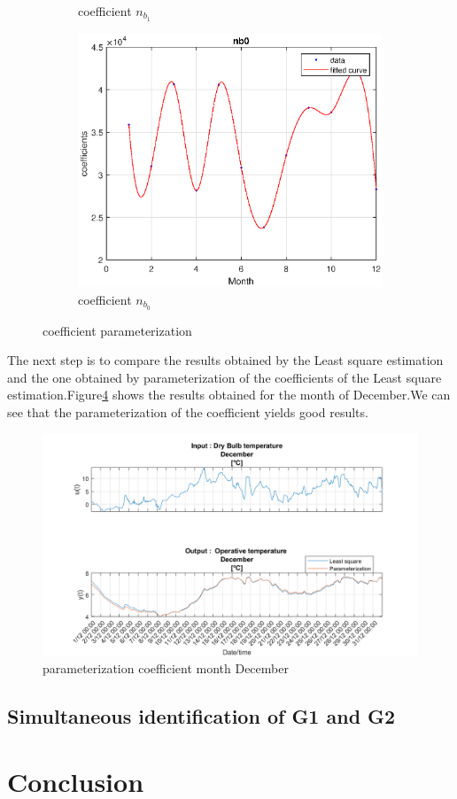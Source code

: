 \documentclass[a4paper,12pt]{article}
\numberwithin{equation}{section}
\begin{document}
\begin{figure}[H]
\begin{subfigure}{.5\textwidth}
  \caption{coefficient $n_{b_{1}}$}
  \label{fig:coeffnb1}
\end{subfigure}%
\begin{subfigure}{.5\textwidth}
  \centering
  \includegraphics[width=.7\linewidth]{coeffnb0.eps}
  \caption{coefficient $n_{b_{0}}$}
  \label{fig:coeffnb0}
\end{subfigure}
\caption{coefficient parameterization}
\label{fig:fitcurves}
\end{figure}


\noindent
The next step is to compare the results obtained by the Least square estimation and the one obtained by parameterization of the coefficients of the Least square estimation.Figure\ref{fig:valparG2} shows the results obtained for the month of December.We can see that the parameterization of the coefficient yields good results.

\begin{figure}[H]
    \includegraphics[width=\textwidth]{val_par_G2.png}
    \centering
    \caption{parameterization coefficient month December}
    \label{fig:valparG2}
\end{figure}

\subsection{Simultaneous identification of G1 and G2}

\newpage
\section{Conclusion}
\end{document}
